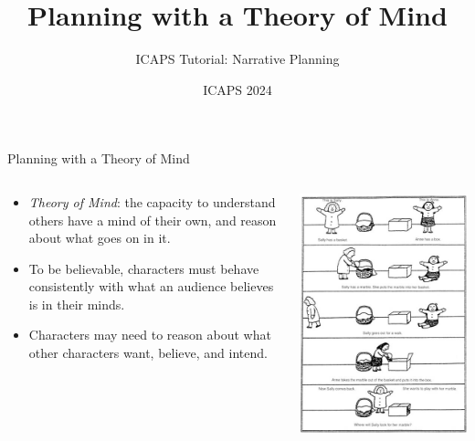\documentclass[utf8,13pt]{beamer}
\begin{document}
\title{Planning with a Theory of Mind}
\institute{}
\author{ICAPS Tutorial: Narrative Planning}
\date{ICAPS 2024}

\frame[label=intro,plain,noframenumbering]{\titlepage}


\begin{frame}{Planning with a Theory of Mind}
  \begin{columns}
    \begin{column}{.62\linewidth}
      \begin{itemize}
      \item \textit{Theory of Mind}: the capacity to understand others
        have a mind of their own, and reason about what goes on in it.
      \item To be believable, characters must behave consistently
        with what an audience believes is in their minds.
      \item Characters may need to reason about what other characters
        want, believe, and intend.
      \end{itemize}
    \end{column}
    \begin{column}{.315\linewidth}
      \includegraphics[width=\linewidth]{sally_anne_test.jpg}\\

\end{column}
\end{columns}
\end{frame}
\end{document}
